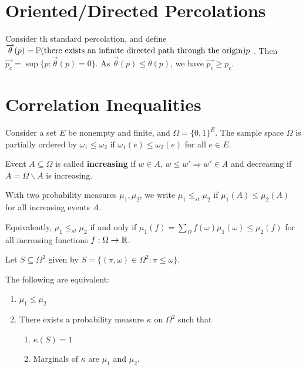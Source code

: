 \section{Oriented/Directed Percolations}
\label{sec:orient-perc}

Consider th standard percolation, and define
$\overrightarrow{\theta}(p) = \Prob(\text{there exists an infinite
  directed path through the origin}){p}$ . Then
$\overrightarrow{p_{c}} = \sup \{ p: \overrightarrow{\theta}(p) = 0
\}$.  As $\overrightarrow{\theta}(p) \leq \theta(p)$, we have
$\overrightarrow{p_{c}} \geq p_{c}$.


\section{Correlation Inequalities}
\label{sec:corr-ineq}

Consider a set $E$ be nonempty and finite, and $\Omega = \{ 0, 1
\}^{E}$.  The sample space $\Omega$ is partially ordered by
$\omega_{1} \leq \omega_{2}$ if $\omega_{1}(e) \leq \omega_{2}(e)$ for
all $e \in E$.

Event $A \subseteq \Omega$ is called \textbf{increasing} if $w \in A$,
$w \leq w' \Rightarrow w' \in A$ and decreasing if $\overline A =
\Omega \backslash A$ is increasing.

\begin{defn}
  \label{defn:random_walks_on_graphs:6}
  With two probability measures $\mu_{1}, \mu_{2}$, we write $\mu_{1}
  \leq_{st} \mu_{2}$ if $\mu_{1}(A) \leq \mu_{2}(A)$ for all
  increasing events $A$.

  Equivalently, $\mu_{1} \leq_{st} \mu_{2}$ if and only if $\mu_{1}(f)
  = \sum_{\Omega} f(\omega) \mu_{1}(\omega) \leq \mu_{2}(f)$ for all
  increasing functions $f: \Omega \rightarrow \mathbb{R}$.
\end{defn}

Let $S \subseteq \Omega^{2}$ given by $S = \{ (\pi, \omega) \in
\Omega^{2}: \pi \leq \omega \}$.

\begin{thm}[Strassen]
  \label{defn:random_walks_on_graphs:7}
  The following are equivalent:
  \begin{enumerate}
  \item $\mu_{1} \leq \mu_{2}$
  \item There exists a probability measure $\kappa$ on $\Omega^{2}$ such
    that
    \begin{enumerate}
    \item $\kappa(S) = 1$
    \item Marginals of $\kappa$ are $\mu_{1}$ and $\mu_{2}$.
    \end{enumerate}
  \end{enumerate}
\end{thm}


